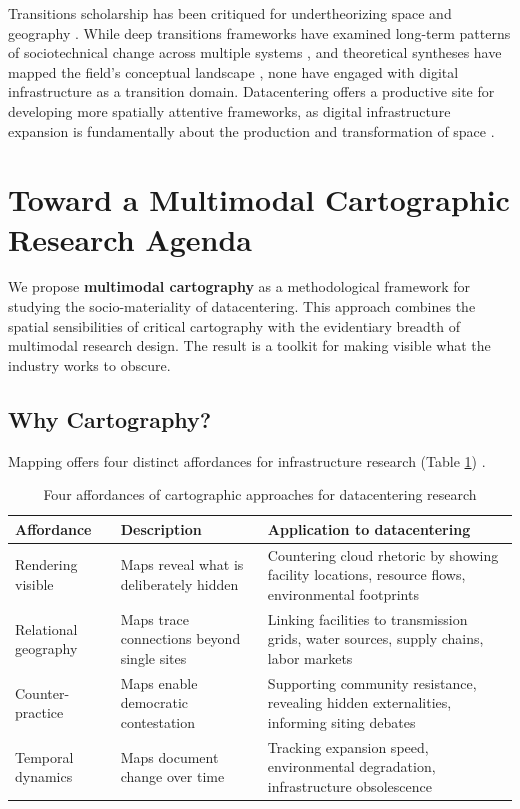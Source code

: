 \documentclass[review]{elsarticle}
\begin{document}
Transitions scholarship has been critiqued for undertheorizing space and geography \citep{Coenen2012, Hansen2015}. While deep transitions frameworks have examined long-term patterns of sociotechnical change across multiple systems \citep{Schot2018}, and theoretical syntheses have mapped the field's conceptual landscape \citep{Sovacool2017}, none have engaged with digital infrastructure as a transition domain. Datacentering offers a productive site for developing more spatially attentive frameworks, as digital infrastructure expansion is fundamentally about the production and transformation of space \citep{Graham2001, Furlong2021}.

\section{Toward a Multimodal Cartographic Research Agenda}

We propose \textbf{multimodal cartography} as a methodological framework for studying the socio-materiality of datacentering. This approach combines the spatial sensibilities of critical cartography with the evidentiary breadth of multimodal research design. The result is a toolkit for making visible what the industry works to obscure.

\subsection{Why Cartography?}

Mapping offers four distinct affordances for infrastructure research (Table \ref{tab:cartography}) \citep{Kitchin1998, Dodge2001}.

\begin{table}[h]
\caption{Four affordances of cartographic approaches for datacentering research}
\label{tab:cartography}
\begin{tabular}{p{2.5cm}p{4.5cm}p{5cm}}
\toprule
\textbf{Affordance} & \textbf{Description} & \textbf{Application to datacentering} \\
\midrule
Rendering visible & Maps reveal what is deliberately hidden & Countering cloud rhetoric by showing facility locations, resource flows, environmental footprints \\
\addlinespace
Relational geography & Maps trace connections beyond single sites & Linking facilities to transmission grids, water sources, supply chains, labor markets \\
\addlinespace
Counter-practice & Maps enable democratic contestation & Supporting community resistance, revealing hidden externalities, informing siting debates \\
\addlinespace
Temporal dynamics & Maps document change over time & Tracking expansion speed, environmental degradation, infrastructure obsolescence \\
\bottomrule
\end{tabular}
\end{table}
\end{document}
